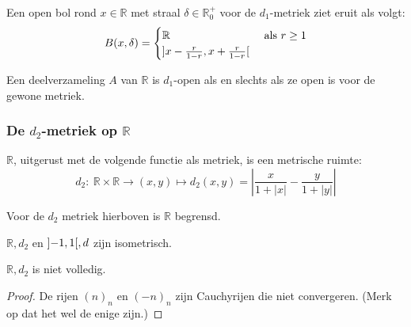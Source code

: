 \documentclass[main.tex]{subfiles}
\begin{document}
\begin{vb}
  Een open bol rond $x\in \mathbb{R}$ met straal $\delta\in \mathbb{R}_{0}^{+}$ voor de $d_{1}$-metriek ziet eruit als volgt:
  \[ B(x,\delta) = 
  \begin{cases}
    \mathbb{R} &\text{ als } r \ge 1\\
    \interval[open]{x-\frac{r}{1-r}}{x+\frac{r}{1-r}}
  \end{cases}
  \]
\end{vb}

\begin{st}
  Een deelverzameling $A$ van $\mathbb{R}$ is $d_{1}$-open als en slechts als ze open is voor de gewone metriek.
\end{st}

\subsubsection{De $d_2$-metriek op $\mathbb{R}$}
\label{sec:d_2-metriek-op}

\begin{vb}
  $\mathbb{R}$, uitgerust met de volgende functie als metriek, is een metrische ruimte:
  \[ d_{2}:\ \mathbb{R}\times\mathbb{R}\rightarrow (x,y) \mapsto d_{2}(x,y)=\left| \frac{x}{1+|x|} - \frac{y}{1+|y|} \right| \]
\end{vb}

\begin{st}
  Voor de $d_{2}$ metriek hierboven is $\mathbb{R}$ begrensd.
\end{st}



\begin{vb}
  $\mathbb{R},d_{2}$ en $\interval[open]{-1}{1},d$ zijn isometrisch.
\end{vb}

\begin{tvb}
  $\mathbb{R},d_{2}$ is niet volledig.
  
  \begin{proof}
    De rijen $(n)_{n}$ en $(-n)_{n}$ zijn Cauchyrijen die niet convergeren.
    (Merk op dat het wel de enige zijn.)
  \end{proof}
\end{tvb}
\end{document}
